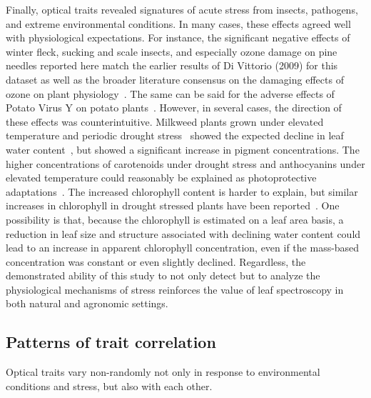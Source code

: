 Finally, optical traits revealed signatures of acute stress from insects, pathogens, and extreme environmental conditions.
In many cases, these effects agreed well with physiological expectations.
For instance, the significant negative effects of winter fleck, sucking and scale insects, and especially ozone damage on pine needles reported here match the earlier results of Di Vittorio (2009) for this dataset as well as the broader literature consensus on the damaging effects of ozone on plant physiology~\cite{lindroth_2010_impacts}. \nocite{divittorio_2009_pigment}
The same can be said for the adverse effects of Potato Virus Y on potato plants~\cite{scholthof_2011_top10}.
However, in several cases, the direction of these effects was counterintuitive.
Milkweed plants grown under elevated temperature and periodic drought stress~\cite{milkweed_data} showed the expected decline in leaf water content~\cite{penuelas_1994_reflectance,kramer_1995_water,cheng_2011_spectroscopic}, but showed a significant increase in pigment concentrations.
The higher concentrations of carotenoids under drought stress and anthocyanins under elevated temperature could reasonably be explained as photoprotective adaptations~\cite{young_1991_photoprotective,steyn_2002_anthocyanins,gould_2004_nature}.
The increased chlorophyll content is harder to explain, but similar increases in chlorophyll in drought stressed plants have been reported~\cite{vilfan_2016_fluspect}.
One possibility is that, because the chlorophyll is estimated on a leaf area basis, a reduction in leaf size and structure associated with declining water content could lead to an increase in apparent chlorophyll concentration, even if the mass-based concentration was constant or even slightly declined.
Regardless, the demonstrated ability of this study to not only detect but to analyze the physiological mechanisms of stress reinforces the value of leaf spectroscopy in both natural and agronomic settings.

\subsection{Patterns of trait correlation}

Optical traits vary non-randomly not only in response to environmental conditions and stress, but also with each other.

